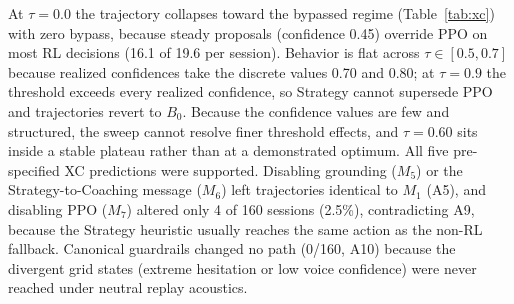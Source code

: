 \documentclass[runningheads,a4paper]{llncs}
\begin{document}
At $\tau=0.0$ the trajectory collapses toward the bypassed regime (Table~\ref{tab:xc}) with zero bypass, because steady proposals (confidence 0.45) override PPO on most RL decisions (16.1 of 19.6 per session). Behavior is flat across $\tau\in[0.5,0.7]$ because realized confidences take the discrete values 0.70 and 0.80; at $\tau=0.9$ the threshold exceeds every realized confidence, so Strategy cannot supersede PPO and trajectories revert to $B_0$. Because the confidence values are few and structured, the sweep cannot resolve finer threshold effects, and $\tau=0.60$ sits inside a stable plateau rather than at a demonstrated optimum. All five pre-specified XC predictions were supported. Disabling grounding ($M_5$) or the Strategy-to-Coaching message ($M_6$) left trajectories identical to $M_1$ (A5), and disabling PPO ($M_7$) altered only 4 of 160 sessions (2.5\%), contradicting A9, because the Strategy heuristic usually reaches the same action as the non-RL fallback. Canonical guardrails changed no path (0/160, A10) because the divergent grid states (extreme hesitation or low voice confidence) were never reached under neutral replay acoustics.
\end{document}
